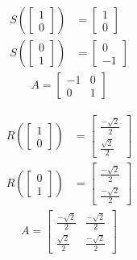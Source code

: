 \documentclass[11pt, a4paper, norsk]{NTNUoving}
\begin{document}
\begin{oppgave}[2]
    \begin{punkt}
        \begin{align*}
            S\left(\begin{bmatrix} 1\\0\end{bmatrix}\right)&=\begin{bmatrix} 1\\0\end{bmatrix}\\
            S\left(\begin{bmatrix} 0\\1\end{bmatrix}\right)&=\begin{bmatrix} 0\\-1\end{bmatrix}
        \end{align*}
        \begin{align*}
            A=\begin{bmatrix} -1&0\\0&1\end{bmatrix}
        \end{align*}
    \end{punkt}
    \begin{punkt}
        \begin{align*}
            R\left(\begin{bmatrix} 1\\0\end{bmatrix}\right)&=\begin{bmatrix} \frac{-\sqrt{2}}{2}\\\frac{\sqrt{2}}{2}\end{bmatrix}\\
            R\left(\begin{bmatrix} 0\\1\end{bmatrix}\right)&=\begin{bmatrix} \frac{-\sqrt{2}}{2}\\\frac{-\sqrt{2}}{2}\end{bmatrix}
        \end{align*}
        \begin{align*}
            A=\begin{bmatrix} \frac{-\sqrt{2}}{2}&\frac{-\sqrt{2}}{2}\\\frac{\sqrt{2}}{2}&\frac{-\sqrt{2}}{2}\end{bmatrix}
        \end{align*}
    \end{punkt}
\end{oppgave}
\end{document}
